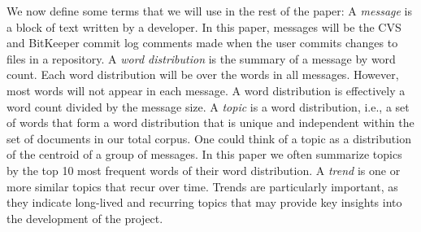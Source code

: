 \documentclass[times, 10pt,twocolumn]{article}
\newcommand{\shrinkit}{\vspace*{-.3em}}
\begin{document}
\shrinkit
{}
\shrinkit


We now define some terms that we will use in the rest of the paper: A
\emph{message} is a block of text written by a developer. In this
paper, messages will be the CVS and BitKeeper commit log comments made
when the user commits changes to files in a repository. A \emph{word
  distribution} is the summary of a message by word count. Each word
distribution will be over the words in all messages. However, most
words will not appear in each message. A word distribution is effectively
a word count divided by the message size. A \emph{topic} is a word
distribution, i.e., a set of words that form a word distribution that is
unique and independent within the set of documents in our total
corpus. One could think of a topic as a distribution of the centroid
of a group of messages. In this paper we often summarize topics by the
top 10 most frequent words of their word distribution.  A \emph{trend}
is one or more similar topics that recur over time.  Trends are
particularly important, as they indicate long-lived and recurring
topics that may provide key insights into the development of the
project.
\end{document}
